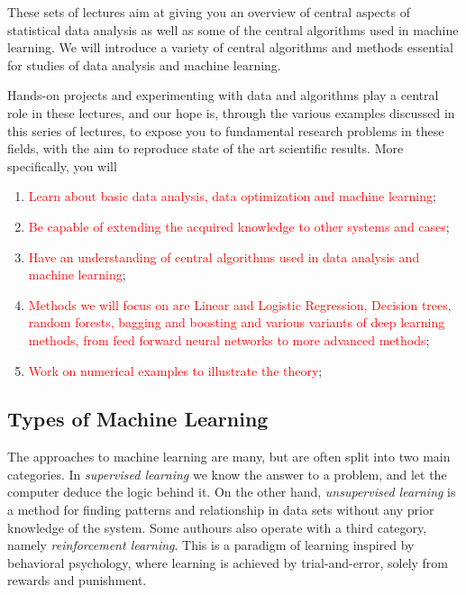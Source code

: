 \documentclass[%
oneside,                 %
final,                   %
10pt]{article}
\begin{document}
These sets of lectures aim at giving you an overview of central aspects of
statistical data analysis as well as some of the central algorithms
used in machine learning.  We will introduce a variety of central
algorithms and methods essential for studies of data analysis and
machine learning. 

Hands-on projects and experimenting with data and algorithms play a central role in
these lectures, and our hope is, through the various examples discussed in this series of lectures,
to  expose you to fundamental
research problems in these fields, with the aim to reproduce state of
the art scientific results. 
More specifically, you will

\begin{enumerate}
\item \textcolor{red}{Learn about basic data analysis, data optimization and machine learning};

\item \textcolor{red}{Be capable of extending the acquired knowledge to other systems and cases};

\item \textcolor{red}{Have an understanding of central algorithms used in data analysis and machine learning};

\item \textcolor{red}{Methods we will focus on are Linear and Logistic Regression, Decision trees, random forests, bagging and boosting and various variants of deep learning methods, from feed forward neural networks to more advanced methods};

\item \textcolor{red}{Work on numerical examples to illustrate the theory}; 
\end{enumerate}

\noindent


\subsection*{Types of Machine Learning}


The approaches to machine learning are many, but are often split into
two main categories.  In \emph{supervised learning} we know the answer to a
problem, and let the computer deduce the logic behind it. On the other
hand, \emph{unsupervised learning} is a method for finding patterns and
relationship in data sets without any prior knowledge of the system.
Some authours also operate with a third category, namely
\emph{reinforcement learning}. This is a paradigm of learning inspired by
behavioral psychology, where learning is achieved by trial-and-error,
solely from rewards and punishment.
\end{document}
